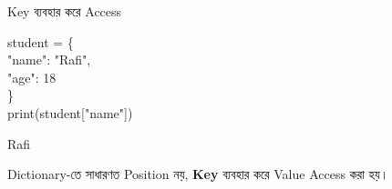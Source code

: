 

\begin{codeoutputbox}{Key ব্যবহার করে Access}

\noindent
\begin{minipage}[t]{0.56\linewidth}
\codeheading

\begin{english}
\ttfamily
student = \{\\
\hspace*{4mm}"name": "Rafi",\\
\hspace*{4mm}"age": 18\\
\}\\
print(student["name"])
\end{english}

\end{minipage}
\hfill
\begin{minipage}[t]{0.40\linewidth}
\outputheading

\begin{center}
\textenglish{\ttfamily Rafi}
\end{center}

Dictionary-তে সাধারণত Position নয়,
\textbf{Key} ব্যবহার করে Value Access করা হয়।

\end{minipage}

\end{codeoutputbox}



